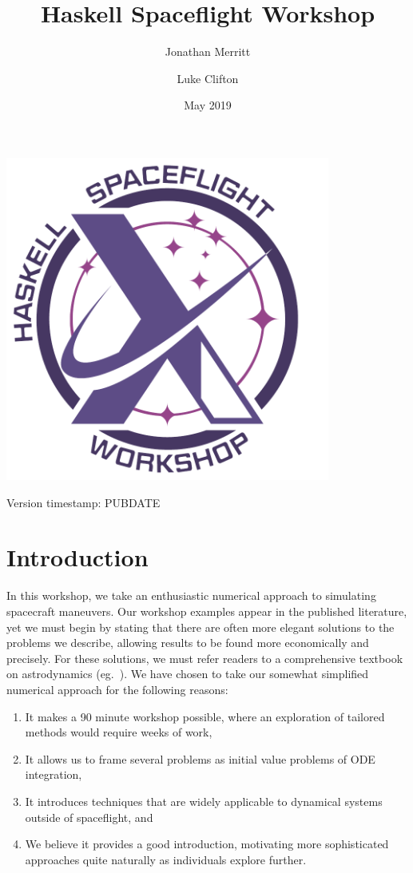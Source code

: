 \documentclass[12pt,openany]{book}
\title{Haskell Spaceflight Workshop}
\author{Jonathan Merritt \and Luke Clifton}
\date{May 2019}
\begin{document}
\begin{titlepage}
\begin{center}
  \vspace*{2cm}
  {\Huge\MakeUppercase{\thetitle}}\par
  \vspace{1.5cm}
  \includegraphics[width=0.8\textwidth]{fig/logo-text.pdf}\par
  \vspace{1.5cm}
  {\Large\theauthor}\par
  {\Large\thedate}\par           
  Version timestamp: PUBDATE
\end{center}
\end{titlepage}

\tableofcontents

\chapter{Introduction}

In this workshop, we take an enthusiastic numerical approach to simulating spacecraft maneuvers. Our workshop examples appear in the published literature, yet we must begin by stating that there are often more elegant solutions to the problems we describe, allowing results to be found more economically and precisely. For these solutions, we must refer readers to a comprehensive textbook on astrodynamics (eg.~\cite{battin1999}). We have chosen to take our somewhat simplified numerical approach for the following reasons:
\begin{enumerate}
\item{It makes a 90 minute workshop possible, where an exploration of tailored methods would require weeks of work,}
\item{It allows us to frame several problems as initial value problems of ODE integration,}
\item{It introduces techniques that are widely applicable to dynamical systems outside of spaceflight, and}
\item{We believe it provides a good introduction, motivating more sophisticated approaches quite naturally as individuals explore further.}
\end{enumerate}

\clearpage{}
{}


\end{document}
